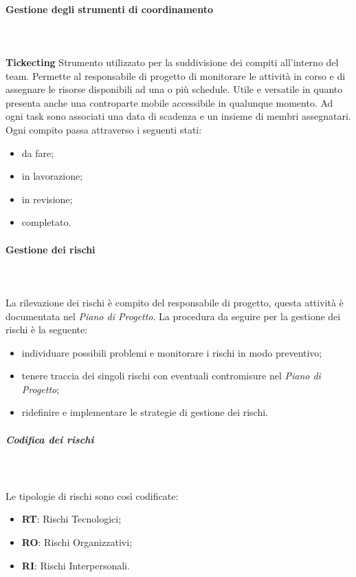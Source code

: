 			\paragraph{Gestione degli strumenti di coordinamento} \mbox{}\\ \mbox{}\\
			\textbf{Tickecting} \newline \newline
			Strumento utilizzato per la suddivisione dei compiti all'interno del team. Permette al responsabile di progetto di monitorare le attività in corso e di assegnare le risorse disponibili ad una o più schedule\glo.\newline
			Utile e versatile in quanto presenta anche una controparte mobile accessibile in qualunque momento. Ad ogni task sono associati una data di scadenza e un insieme di membri assegnatari. Ogni compito passa attraverso i seguenti stati:
			\begin{itemize}
				\item da fare;
				\item in lavorazione;
				\item in revisione;
				\item completato.
			\end{itemize}


			\paragraph{Gestione dei rischi} \mbox{}\\ \mbox{}\\
			La rilevazione dei rischi è compito del responsabile di progetto, questa attività è documentata nel \textit{Piano di Progetto}.
	        La procedura da seguire per la gestione dei rischi è la seguente:
			\begin{itemize}
				\item individuare possibili problemi e monitorare i rischi in modo preventivo;
				\item tenere traccia dei singoli rischi con eventuali contromisure nel \textit{Piano di Progetto};
				\item ridefinire e implementare le strategie di gestione dei rischi.
			\end{itemize}
			
			\noindent
			\subparagraph{Codifica dei rischi} \mbox{}\\ \mbox{}\\
				Le tipologie di rischi sono così codificate:
				\begin{itemize}
					\item \textbf{RT}: Rischi Tecnologici;
					\item \textbf{RO}: Rischi Organizzativi;
					\item \textbf{RI}: Rischi Interpersonali.
				\end{itemize}


